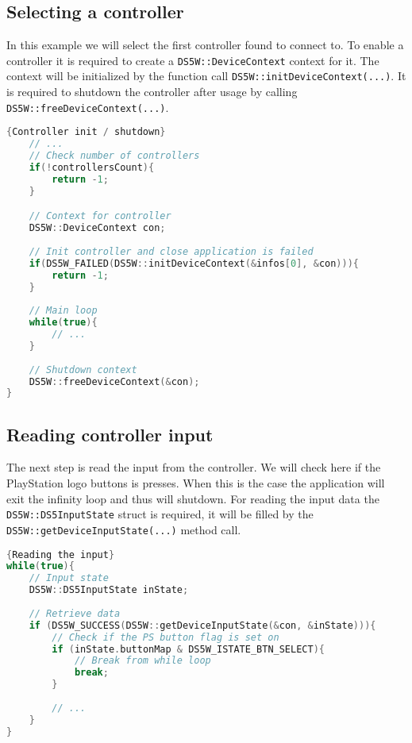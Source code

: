 \subsection{Selecting a controller}
In this example we will select the first controller found to connect to. To enable a controller it is required to create a \texttt{DS5W::DeviceContext} context for it. The context will be initialized by the function call \texttt{DS5W::initDeviceContext(...)}. It is required to shutdown the controller after usage by calling \\
\texttt{DS5W::freeDeviceContext(...)}.\\

\begin{minipage}{\textwidth}
\begin{lstlisting}[language=C++,label=code2,caption={Controller init / shutdown}]{Controller init / shutdown}
	// ...
	// Check number of controllers
	if(!controllersCount){
		return -1;
	}

	// Context for controller
	DS5W::DeviceContext con;
	
	// Init controller and close application is failed
	if(DS5W_FAILED(DS5W::initDeviceContext(&infos[0], &con))){
		return -1;
	}
	
	// Main loop
	while(true){
		// ...
	}
	
	// Shutdown context
	DS5W::freeDeviceContext(&con);
}
\end{lstlisting}
\end{minipage}

\subsection{Reading controller input}
The next step is read the input from the controller. We will check here if the PlayStation logo buttons is presses. When this is the case the application will exit the infinity loop and thus will shutdown. For reading the input data the \texttt{DS5W::DS5InputState} struct is required, it will be filled by the \texttt{DS5W::getDeviceInputState(...)} method call. \\

\begin{minipage}{\textwidth}
\begin{lstlisting}[language=C++,label=code3,caption={Reading the input}]{Reading the input}
while(true){
	// Input state
	DS5W::DS5InputState inState;
	
	// Retrieve data
	if (DS5W_SUCCESS(DS5W::getDeviceInputState(&con, &inState))){
		// Check if the PS button flag is set on
		if (inState.buttonMap & DS5W_ISTATE_BTN_SELECT){
			// Break from while loop
			break;
		}
		
		// ...
	}
}
\end{lstlisting}
\end{minipage}

